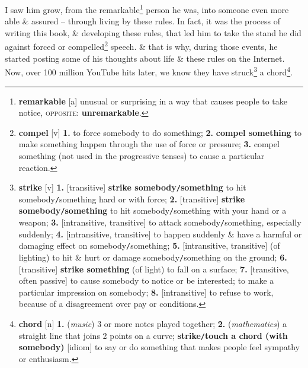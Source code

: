 \documentclass[oneside]{book}
\numberwithin{equation}{section}
\begin{document}
I saw him grow, from the remarkable\footnote{\textbf{remarkable} [a] unusual or surprising in a way that causes people to take notice, \textsc{opposite}: \textbf{unremarkable}.} person he was, into someone even more able \& assured -- through living by these rules. In fact, it was the process of writing this book, \& developing these rules, that led him to take the stand he did against forced or compelled\footnote{\textbf{compel} [v] \textbf{1.} to force somebody to do something; \textbf{2.} \textbf{compel something} to make something happen through the use of force or pressure; \textbf{3.} compel something (not used in the progressive tenses) to cause a particular reaction.} speech. \& that is why, during those events, he started posting some of his thoughts about life \& these rules on the Internet. Now, over 100 million YouTube hits later, we know they have struck\footnote{\textbf{strike} [v] \textbf{1.} [transitive] \textbf{strike somebody\texttt{/}something} to hit somebody\texttt{/}something hard or with force; \textbf{2.} [transitive] \textbf{strike somebody\texttt{/}something} to hit somebody\texttt{/}something with your hand or a weapon; \textbf{3.} [intransitive, transitive] to attack somebody\texttt{/}something, especially suddenly; \textbf{4.} [intransitive, transitive] to happen suddenly \& have a harmful or damaging effect on somebody\texttt{/}something; \textbf{5.} [intransitive, transitive] (of lighting) to hit \& hurt or damage somebody\texttt{/}something on the ground; \textbf{6.} [transitive] \textbf{strike something} (of light) to fall on a surface; \textbf{7.} [transitive, often passive] to cause somebody to notice or be interested; to make a particular impression on somebody; \textbf{8.} [intransitive] to refuse to work, because of a disagreement over pay or conditions.} a chord\footnote{\textbf{chord} [n] \textbf{1.} (\textit{music}) 3 or more notes played together; \textbf{2.} (\textit{mathematics}) a straight line that joins 2 points on a curve; \textbf{strike\texttt{/}touch a chord (with somebody)} [idiom] to say or do something that makes people feel sympathy or enthusiasm.}.
\end{document}
